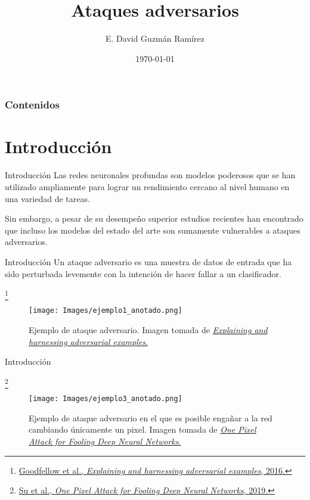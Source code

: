 \documentclass[10pt]{beamer}
\title[Ataques adversarios]{Ataques adversarios} %
\author[IIMAS, UNAM]{E. David Guzmán Ramírez} %
\institute[] %
{	Licenciatura en Ciencia de Datos \\
	Introducción al Aprendizaje Profundo \\ \medskip M. en C. Berenice Montalvo Lezama \\ M. en C. Ricardo Montalvo Lezama
}
\date{{\tiny \today}} %
\newcommand\blfootnote[1]{%
  \begingroup
  \renewcommand\thefootnote{}\footnote{#1}%
  \addtocounter{footnote}{-1}%
  \endgroup
}
\begin{document}
	
	
\begin{frame}
	\titlepage %
\end{frame}

\begin{frame}
\frametitle{Contenidos}
\justify

\tableofcontents
\end{frame}

\section{Introducción}
\begin{frame}{Introducción}
\justify
\small
Las redes neuronales profundas son modelos poderosos que se han utilizado ampliamente para lograr un rendimiento cercano al nivel humano en una variedad de tareas. \medskip

Sin embargo, a pesar de su desempeño superior estudios recientes han encontrado que incluso los modelos del estado del arte son sumamente vulnerables a ataques adversarios.
\end{frame}

\begin{frame}{Introducción}
\justify
\small
Un ataque adversario es una muestra de datos de entrada que ha sido perturbada levemente con la intención de hacer fallar a un clasificador. 

\blfootnote{\vspace*{0.3cm} \href{https://arxiv.org/pdf/1412.6572.pdf}{Goodfellow et al., \emph{Explaining and harnessing adversarial examples}, 2016.}}

\begin{figure}[H]
\centering
\texttt{[image: Images/ejemplo1\_anotado.png]}
\caption{Ejemplo de ataque adversario. Imagen tomada de \href{https://arxiv.org/pdf/1412.6572.pdf}{\emph{Explaining and harnessing adversarial examples}.}}
\end{figure}

\end{frame}

\begin{frame}{Introducción}
\justify
\small

\blfootnote{\vspace*{0.3cm} \href{https://arxiv.org/pdf/1412.6572.pdf}{Su et al., \emph{One Pixel Attack for Fooling Deep Neural Networks}, 2019.}}

\begin{figure}[H]
\centering
\texttt{[image: Images/ejemplo3\_anotado.png]}
\caption{Ejemplo de ataque adversario en el que es posible engañar a la red cambiando únicamente un pixel. Imagen tomada de \href{https://arxiv.org/pdf/1710.08864.pdf}{\emph{One Pixel Attack for Fooling Deep Neural Networks}.}}
\end{figure}

\end{frame}
\end{document}
